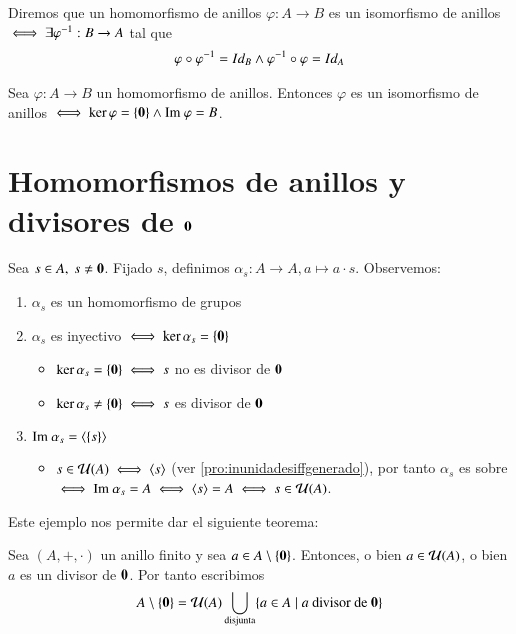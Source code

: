 \begin{dfn}
	Diremos que un homomorfismo de anillos $\varphi:A \to B$ es un isomorfismo de anillos $\iff \exists \varphi^{-1} : B \to A$ tal que
	\begin{align*}
	\varphi \circ \varphi^{-1} = Id_B \land \varphi^{-1} \circ \varphi = Id_A
	\end{align*}
\end{dfn}

\begin{pro}
	Sea $\varphi:A \to B$ un homomorfismo de anillos. Entonces $\varphi$ es un isomorfismo de anillos $\iff \ker \varphi = \{\mathbf{0}\} \land \text{Im } \varphi = B$.
\end{pro}

\section{Homomorfismos de anillos y divisores de $\mathbf{0}$}

\begin{ej}
	Sea $s \in A,\ s\neq \mathbf{0}$. Fijado $s$, definimos $\alpha_s : A \to A, a \mapsto a\cdot s$. Observemos:
	\begin{enumerate}
		\item $\alpha_s$ es un homomorfismo de grupos
		\item $\alpha_s$ es inyectivo $\iff \ker \alpha_s = \{ \mathbf{0} \}$
		\begin{itemize}
			\item $\ker \alpha_s = \{\mathbf{0}\} \iff s$ no es divisor de $\mathbf{0}$
			\item $\ker \alpha_s \neq \{\mathbf{0}\} \iff s$ es divisor de $\mathbf{0}$
		\end{itemize}
		\item $\text{Im } \alpha_s = \langle\{s\}\rangle$
		\begin{itemize}
			\item $s \in \mathcal{U}(A) \iff \langle s\rangle$ (ver \autoref{pro:inunidadesiffgenerado}), por tanto $\alpha_s$ es sobre $\iff \text{Im } \alpha_s = A \iff \langle s\rangle = A \iff s \in \mathcal{U}(A)$.
		\end{itemize}
		
	\end{enumerate}
\end{ej}

Este ejemplo nos permite dar el siguiente teorema:

\begin{thm}
	Sea $(A, +, \cdot)$ un anillo finito y sea $a \in A \setminus \{\mathbf{0}\}$. Entonces, o bien $a \in \mathcal{U}(A)$, o bien $a$ es un divisor de $\mathbf{0}$. Por tanto escribimos
	\begin{align*}
	A \setminus \{\mathbf{0}\} = \mathcal{U}(A) \bigcup_{\text{disjunta}} \{a \in A \mid a \text{ divisor de }\mathbf{0}\}
	\end{align*}
\end{thm}

